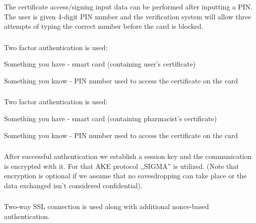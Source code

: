 \subsubsection{}

The certificate access/signing input data can be performed after inputting a PIN. The user is given 4-digit PIN number and the verification system will allow three attempts of typing the correct number before the card is blocked.

\subsubsection{}

Two factor authentication is used:
\begin{packed_enum}
 \item Something you have - smart card (containing user's certificate)
 \item Something you know - PIN number used to access the certificate on the card
\end{packed_enum}

\subsubsection{}

Two factor authentication is used:
\begin{packed_enum}
 \item Something you have - smart card (containing pharmacist's certificate)
 \item Something you know - PIN number used to access the certificate on the card
\end{packed_enum}

\subsubsection{}
After successful authentication we establish a session key and the communication is encrypted with it. For that AKE protocol ,,SIGMA'' is utilized. (Note that encryption is optional if we assume that no eavesdropping can take place or the data exchanged isn't considered confidential).

\subsubsection{}
Two-way SSL connection is used along with additional nonce-based authentication.

